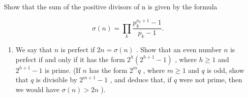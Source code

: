 Show that the sum of the positive divisors of n is given by the formula

\[
\sigma (n) = \prod_ {k} \frac {p _ {k} ^ {\nu_ {k} + 1} - 1}{p _ {k} - 1}.
\]

\begin{enumerate}
\def\labelenumi{\alph{enumi})}
\setcounter{enumi}{1}
\tightlist
\item
  We say that \(n\) is perfect if \(2n = \sigma(n)\) . Show that an even number \(n\) is perfect if and only if it has the form \(2^h(2^{h+1} - 1)\) , where \(h \geqslant 1\) and \(2^{h+1} - 1\) is prime. (If \(n\) has the form \(2^m q\) , where \(m \geqslant 1\) and \(q\) is odd, show that \(q\) is divisible by \(2^{m+1} - 1\) , and deduce that, if \(q\) were not prime, then we would have \(\sigma(n) > 2n\) ).
\end{enumerate}

